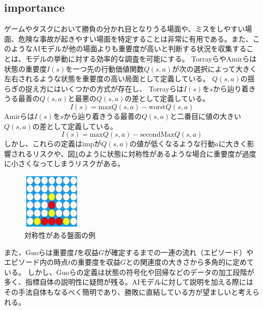 \subsection{importance}
ゲームやタスクにおいて勝負の分かれ目となりうる場面や、ミスをしやすい場面、危険な事故が起きやすい場面を特定することは非常に有用である。また、このようなAIモデルが他の場面よりも重要度が高いと判断する状況を収集することは、モデルの挙動に対する効率的な調査を可能にする。
Torrayら\cite{imp2013}やAmirら\cite{imp2016}は状態の重要度$I(s)$を一つ先の行動価値関数$Q(s, a)$が次の選択によって大きく左右されるような状態を重要度の高い局面として定義している。
$Q(s, a)$の揺らぎの捉え方にはいくつかの方式が存在し、
Torrayらは$I(s)$を$s$から辿り着きうる最善の$Q(s, a)$と最悪の$Q(s, a)$の差として定義している。
\begin{equation}
	{I(s)= \textrm{max}Q(s, a)-\textrm{worst}Q(s, a)}
\end{equation}
Amirらは$I(s)$を$s$から辿り着きうる最善の$Q(s, a)$と二番目に値の大きい$Q(s, a)$の差として定義している。
\begin{equation}
    \label{imp}
	{I(s)= \textrm{max}Q(s, a)-\textrm{secondMax}Q(s, a)}
\end{equation}
しかし、これらの定義はimpが$Q(s, a)$の値が低くなるような行動$a$に大きく影響されるリスクや、図\ref{fig:symmetry}のように状態に対称性があるような場合に重要度が過度に小さくなってしまうリスクがある。
\begin{figure}[t]
	\centering
	\includegraphics[width=80pt]{./figure/symmetry.png}
	\caption{対称性がある盤面の例}
	\label{fig:symmetry}
\end{figure}
また、Guoら\cite{EDGE}は重要度$I$を収益$G$が確定するまでの一連の流れ（エピソード）やエピソード内の時点$t$の重要度を収益$G$との関連度の大きさから多角的に定めている。
しかし、Guoらの定義は状態の符号化や回帰などのデータの加工段階が多く、指標自体の説明性に疑問が残る。AIモデルに対して説明を加える際にはその手法自体もなるべく簡明であり、勝敗に直結している方が望ましいと考えられる。





